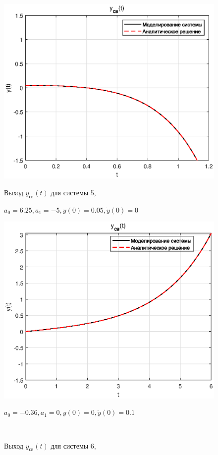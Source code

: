\documentclass[a4paper]{article}
\begin{document}
\begin{figure}[H]
    \begin{minipage}{0.5\textwidth}
        \centering \includegraphics[width=\textwidth]{ex1/5.eps}
        \caption{Выход $y_{\text{св}}(t)$ для системы 5,}
        \centerline{$a_0 = 6.25, a_1 = -5, y(0) = 0.05, \dot{y}(0) = 0$}
    \end{minipage}\hfill
    \begin{minipage}{0.5\textwidth}
        \centering \includegraphics[width=\textwidth]{ex1/6.eps}
        \caption{Выход $y_{\text{св}}(t)$ для системы 6,}
        \centerline{$a_0 = -0.36, a_1 = 0, y(0) = 0, \dot{y}(0) = 0.1$}
    \end{minipage}\\[1em]
\end{figure}\noindent\
\end{document}
